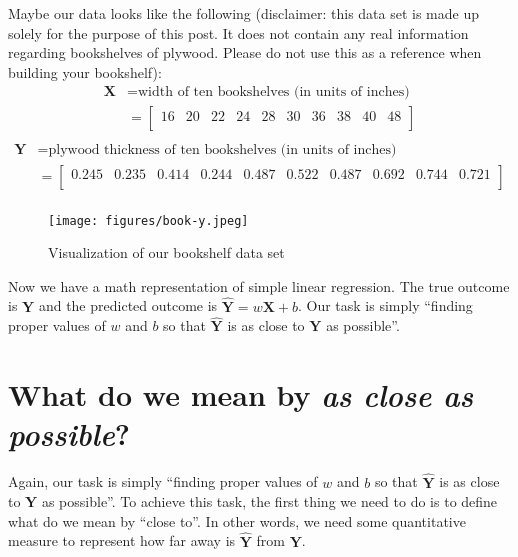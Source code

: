 \documentclass[
	letterpaper
]{article}
\begin{document}
Maybe our data looks like the following (disclaimer: this data set is made up solely for the purpose of this post. It does not contain any real information regarding bookshelves of plywood. Please do not use this as a reference when building your bookshelf):
\begin{equation}
\begin{split}
\mathbf{X} &= \text {width of ten bookshelves (in units of inches)} \\
&= 
\begin{bmatrix}
16 & 20 & 22 & 24 & 28 & 30 &  36 & 38 & 40 & 48\\
\end{bmatrix}\\
\end{split}
\end{equation}
\begin{equation}
\begin{split}
\mathbf{Y} &= \text {plywood thickness of ten bookshelves (in units of inches)} \\
&= 
\begin{bmatrix}
0.245 & 0.235 & 0.414 & 0.244 & 0.487 & 0.522 &  0.487 & 0.692 & 0.744 & 0.721\\
\end{bmatrix}\\
\end{split}
\end{equation}
\begin{figure}[htbp]
	\centering
	\texttt{[image: figures/book-y.jpeg]}
	\caption{Visualization of our bookshelf data set}
	\label{fig:book-y}
\end{figure}

Now we have a math representation of simple linear regression.
The true outcome is $\mathbf{Y}$ and the predicted outcome is $\mathbf{\hat Y} = w\mathbf{X} + b$.
Our task is simply ``finding proper values of $w$ and $b$ so that $\mathbf{\hat Y}$ is as close to $\mathbf{Y}$ as possible''.
\section{What do we mean by \textit{as close as possible}?}
Again, our task is simply ``finding proper values of $w$ and $b$ so that $\mathbf{\hat Y}$ is as close to $\mathbf{Y}$ as possible''.
To achieve this task, the first thing we need to do is to define what do we mean by ``close to''.
In other words, we need some quantitative measure to represent how far away is $\mathbf{\hat Y}$ from $\mathbf{Y}$.
\end{document}

